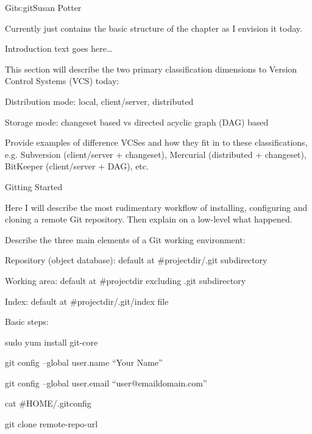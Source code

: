 \begin{aosachapter}{Git}{s:git}{Susan Potter}

Currently just contains the basic structure of the chapter as I envision 
it today.

Introduction text goes here\ldots


This section will describe the two primary classification dimensions to 
Version Control Systems (VCS) today:

\begin{aosasect1}
  \item Distribution mode: local, client/server, distributed
  \item Storage mode: changeset based vs directed acyclic graph (DAG) based
\end{aosasect1}

Provide examples of difference VCSes and how they fit in to these 
classifications, e.g. Subversion (client/server + changeset), Mercurial 
(distributed + changeset), BitKeeper (client/server + DAG), etc.

\begin{aosasect1}{Gitting Started}

Here I will describe the most rudimentary workflow of installing, configuring 
and cloning a remote Git repository. Then explain on a low-level what happened.

Describe the three main elements of a Git working environment:
\begin{aosaitemize}
  \item Repository (object database): default at #{projectdir}/.git subdirectory
  \item Working area: default at #{projectdir} excluding .git subdirectory
  \item Index: default at #{projectdir}/.git/index file
\end{aosaitemize}

Basic steps:
\begin{aosaitemize}
  \item sudo yum install git-core
  \item git config --global user.name ``Your Name''
  \item git config --global user.email ``user@emaildomain.com''
  \item cat #{HOME}/.gitconfig
  \item git clone remote-repo-url
\end{aosaitemize}


\end{aosasect1}
\end{aosachapter}
